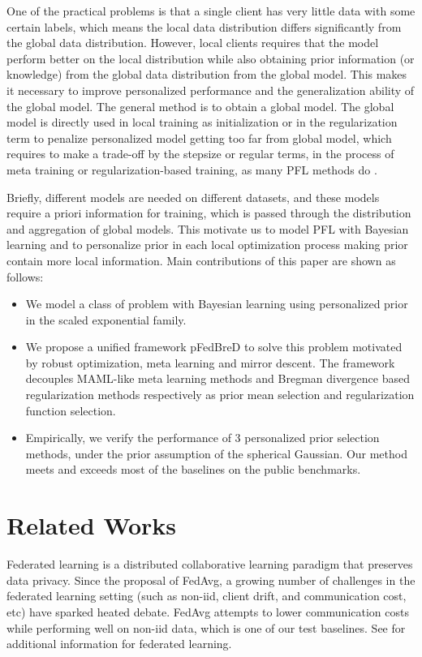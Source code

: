 \documentclass{article}
\begin{document}
One of the practical problems is that a single client has very little data with some certain labels, which means the local data distribution differs significantly from the global data distribution.\cite{kairouz2021advances,tan2022towards} However, local clients requires that the model perform better on the local distribution while also obtaining prior information (or knowledge) from the global data distribution from the global model. This makes it necessary to improve personalized performance and the generalization ability of the global model. The general method is to obtain a global model. The global model is directly used in local training as initialization or in the regularization term to penalize personalized model getting too far from global model, which requires to make a trade-off by the stepsize or regular terms, in the process of meta training or regularization-based training, as many PFL methods do \cite{tan2022towards}.

Briefly, different models are needed on different datasets, and these models require a priori information for training, which is passed through the distribution and aggregation of global models. This motivate us to model PFL with Bayesian learning and to personalize prior in each local optimization process making prior contain more local information. Main contributions of this paper are shown as follows:
\begin{itemize}
    \item We model a class of problem with Bayesian learning using personalized prior in the scaled exponential family.
    \item We propose a unified framework pFedBreD to solve this problem motivated by robust optimization, meta learning and mirror descent. The framework decouples MAML-like meta learning methods and Bregman divergence based regularization methods respectively as prior mean selection and regularization function selection.
    \item Empirically, we verify the performance of 3 personalized prior selection methods, under the prior assumption of the spherical Gaussian. Our method meets and exceeds most of the baselines on the public benchmarks.
\end{itemize}


\section{Related Works}
\label{sec_rltdw}

Federated learning is a distributed collaborative learning paradigm that preserves data privacy. Since the proposal of FedAvg\cite{mcmahan2017communication}, a growing number of challenges\cite{kairouz2021advances} in the federated learning setting (such as non-iid\cite{zhao2018federated, zhu2021federated}, client drift\cite{karimireddy2020mime, karimireddy2020scaffold}, and communication cost\cite{konevcny2016federated, zhou2021communication}, etc) have sparked heated debate. FedAvg attempts to lower communication costs while performing well on non-iid data, which is one of our test baselines. See \cite{kairouz2021advances} for additional information for federated learning.
\end{document}
